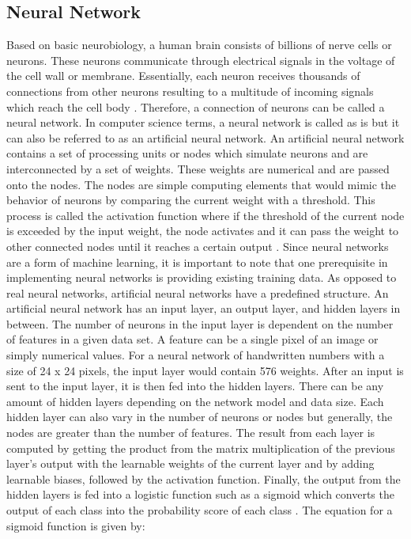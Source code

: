 \documentclass[journal]{./IEEE/IEEEtran}
\begin{document}
\subsection{Neural Network}
Based on basic neurobiology, a human brain consists of billions of nerve cells or neurons. These neurons communicate through electrical signals in the voltage of the cell wall or membrane. Essentially, each neuron receives thousands of connections from other neurons resulting to a multitude of incoming signals which reach the cell body \cite{Gurney1997}. Therefore, a connection of neurons can be called a neural network. In computer science terms, a neural network is called as is but it can also be referred to as an artificial neural network.
\newline
\indent An artificial neural network contains a set of processing units or nodes which simulate neurons and are interconnected by a set of weights. These weights are numerical and are passed onto the nodes. The nodes are simple computing elements that would mimic the behavior of neurons by comparing the current weight with a threshold. This process is called the activation function where if the threshold of the current node is exceeded by the input weight, the node activates and it can pass the weight to other connected nodes until it reaches a certain output \cite{Cross1995}. Since neural networks are a form of machine learning, it is important to note that one prerequisite in implementing neural networks is providing existing training data. 
\newline
\indent As opposed to real neural networks, artificial neural networks have a predefined structure. An artificial neural network has an input layer, an output layer, and hidden layers in between. The number of neurons in the input layer is dependent on the number of features in a given data set. A feature can be a single pixel of an image or simply numerical values. For a neural network of handwritten numbers with a size of 24 x 24 pixels, the input layer would contain 576 weights. After an input is sent to the input layer, it is then fed into the hidden layers. There can be any amount of hidden layers depending on the network model and data size. Each hidden layer can also vary in the number of neurons or nodes but generally, the nodes are greater than the number of features. The result from each layer is computed by getting the product from the matrix multiplication of the previous layer's output with the learnable weights of the current layer and by adding learnable biases, followed by the activation function. Finally, the output from the hidden layers is fed into a logistic function such as a sigmoid which converts the output of each class into the probability score of each class \cite{MishraND}. The equation for a sigmoid function is given by:
\end{document}
